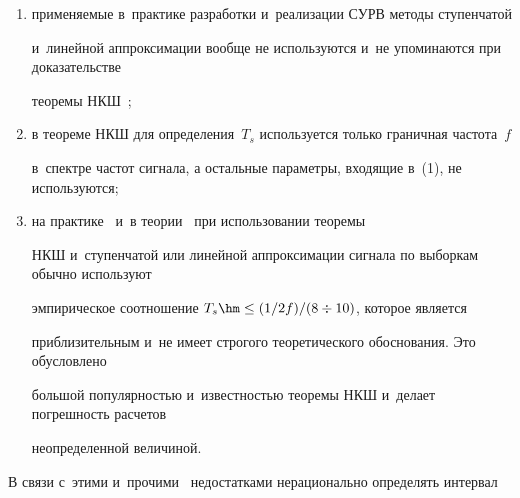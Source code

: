 \begin{enumerate}[(1)]
\begin{equation}
  \end{equation}


где $k$~--- номер отсчета (выборки) на интервале времени~$T_c$; $2T_c f$~--- число 


отсчетов на интервале времени~$T_c$; $p_k$~--- амплитуда отсчета с~номером~$k$.





  Выражение~(2) подобно гармоническому ряду Фурье и~является сложным с~точки зрения 


объема необходимых вычислительных операций для его реализации. Выражения для 


ступенчатой и~линейной аппроксимации (для восстановления сигнала по выборкам из него) 


существенно проще в~математическом описании и~реализации;


  \item  применяемые в~практике разработки и~реализации СУРВ методы ступенчатой 


и~линейной аппроксимации вообще не используются и~не упоминаются при доказательстве 


теоремы НКШ~\cite{4-m, 6-m};


  \item в теореме НКШ для определения~$T_s$ используется только граничная частота~$f$ 


в~спектре частот сигнала, а остальные параметры, входящие в~(1), не используются; 


  \item на практике~\cite{8-m} и~в теории~\cite{9-m, 10-m} при использовании теоремы 


НКШ и~ступенчатой или линейной аппроксимации сигнала по выборкам обычно используют 


эмпирическое соотношение $T_s\hm\leq (1/2f)/(8\div 10)$, которое является 


приблизительным и~не имеет строгого теоретического обоснования. Это обусловлено 


большой популярностью и~известностью теоремы НКШ и~делает погрешность расчетов 


неопределенной величиной.


  \end{enumerate}


  


  В связи с~этими и~прочими~\cite{11-m} недостатками нерационально определять интервал 


